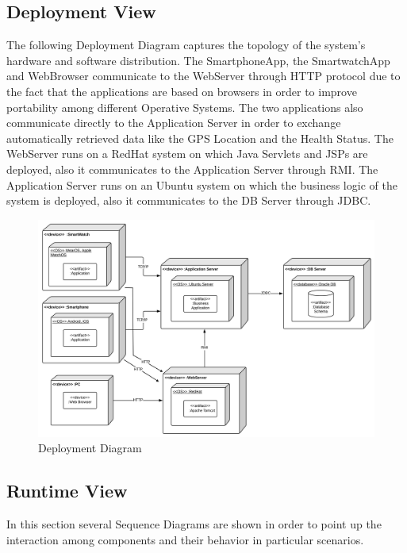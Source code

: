 \subsection{Deployment View}
The following Deployment Diagram captures the topology of the system's hardware and software distribution.
\bigbreak
\noindent
The SmartphoneApp, the SmartwatchApp and WebBrowser communicate to the WebServer through HTTP protocol due to the fact that the applications are based on browsers in order to improve portability among different Operative Systems. The two applications also communicate directly to the Application Server in order to exchange automatically retrieved data like the GPS Location and the Health Status.
\bigbreak
\noindent
The WebServer runs on a RedHat system on which Java Servlets and JSPs are deployed, also it communicates to the Application Server through RMI.
\bigbreak
\noindent
The Application Server runs on an Ubuntu system on which the business logic  of the system is deployed, also it communicates to the DB Server through JDBC.
\vspace{1.0 cm}

\begin{figure}[H]
\centering
\includegraphics[scale=0.11]{Images/DeploymentDiagram.png}
\caption{Deployment Diagram}
\end{figure}
\newpage

\subsection{Runtime View}
In this section several Sequence Diagrams are shown in order to point up the interaction among components and their behavior in particular scenarios.
